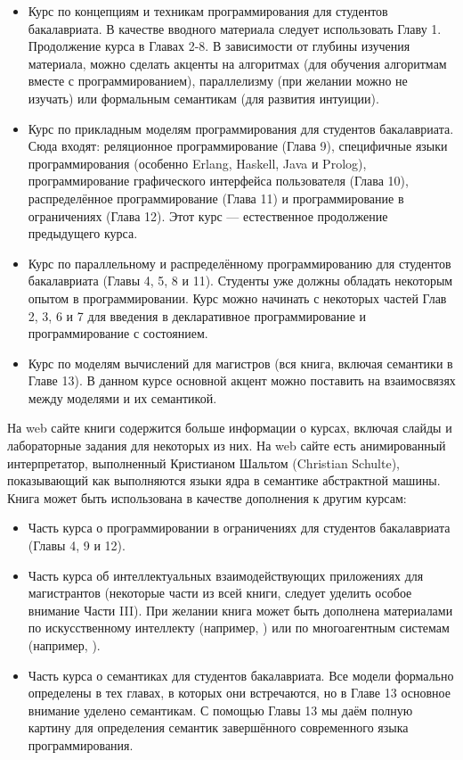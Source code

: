 \begin{itemize}
\item{Курс по концепциям и техникам программирования для студентов бакалавриата. В качестве вводного материала следует использовать Главу 1. Продолжение курса в Главах 2-8. В зависимости от глубины изучения материала, можно сделать акценты на алгоритмах (для обучения алгоритмам вместе с программированием), параллелизму (при желании можно не изучать) или формальным семантикам (для развития интуиции).}

\item{Курс по прикладным моделям программирования для студентов бакалавриата. Сюда входят: реляционное программирование (Глава 9), специфичные языки программирования (особенно {Erlang}, {Has\-kell}, {Java} и {Prolog}), программирование графического интерфейса пользователя (Глава 10), распределённое программирование (Глава 11) и программирование в ограничениях (Глава 12). Этот курс --- естественное продолжение предыдущего курса.}

\item{Курс по параллельному и распределённому программированию для студентов бакалавриата (Главы 4, 5, 8 и 11). Студенты уже должны обладать некоторым опытом в программировании. Курс можно начинать с некоторых частей Глав 2, 3, 6 и 7 для введения в декларативное программирование и программирование с состоянием.}

\item{Курс по моделям вычислений для магистров (вся книга, включая семантики в Главе 13). В данном курсе основной акцент можно поставить на взаимосвязях между моделями и их семантикой.}
\end{itemize}

На web сайте книги содержится больше информации о курсах, включая слайды и лабораторные задания для некоторых из них. На web сайте есть анимированный интерпретатор, выполненный Кристианом Шальтом (Christian Schulte), показывающий как выполняются языки ядра в семантике абстрактной машины. Книга может быть использована в качестве дополнения к другим курсам:

\begin{itemize}
\item{Часть курса о программировании в ограничениях для студентов бакалавриата (Главы 4, 9 и 12).}

\item{Часть курса об интеллектуальных взаимодействующих приложениях для магистрантов (некоторые части из всей книги, следует уделить особое внимание Части III). При желании книга может быть дополнена материалами по искусственному интеллекту (например, \cite{160}) или по многоагентным системам (например, \cite{205}).}

\item{Часть курса о семантиках для студентов бакалавриата. Все модели формально определены в тех главах, в которых они встречаются, но в Главе 13 основное внимание уделено семантикам. С помощью Главы 13 мы даём полную картину для определения семантик завершённого современного языка программирования.}
\end{itemize}


